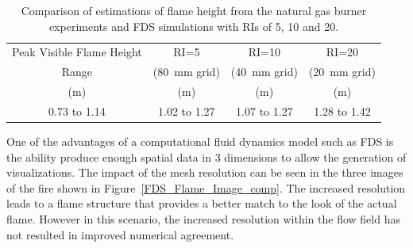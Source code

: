 \documentclass[twoside]{uocthesis}
\begin{document}
{\begin{table}[h]
  \small
  \centering
  \begin{tabular}{|c|c|c|c|}
    \hline Peak Visible Flame Height   	& RI=5       		& RI=10      		& RI=20  \\
    Range          						&  (80~mm grid)  	&  (40~mm grid)  	&  (20~mm grid)  \\
    (m)     							& (m) 				& (m) 				& (m)  			 \\ \hline
    \hline 0.73 to 1.14         		& 1.02 to 1.27      & 1.07 to 1.27      & 1.28 to 1.42   \\
    \hline
  \end{tabular}
  \caption[Comparison of estimations of flame height from the natural gas burner experiments and FDS simulations with RIs of 5, 10 and 20.]{Comparison of estimations of flame height from the natural gas burner experiments and FDS simulations with RIs of 5, 10 and 20.}
  \label{tab:FDS_FH}
\end{table}

One of the advantages of a computational fluid dynamics model such as FDS is the ability produce enough spatial data in 3 dimensions to allow the generation of visualizations.  The impact of the mesh resolution can be seen in the three images of the fire shown in Figure~\ref{FDS_Flame_Image_comp}.  The increased resolution leads to a flame structure that provides a better match to the look of the actual flame.  However in this scenario, the increased resolution within the flow field has not resulted in improved numerical agreement.

}
\end{document}
